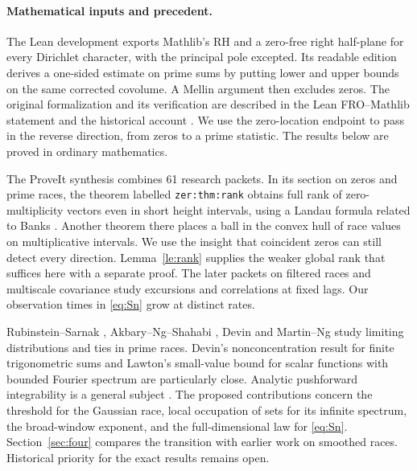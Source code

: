 \documentclass[11pt,letterpaper]{article}
\begin{document}
\paragraph{Mathematical inputs and precedent.}
The Lean development \cite{sernau} exports Mathlib's RH and a zero-free right half-plane for every Dirichlet character, with the principal pole excepted. Its readable edition derives a one-sided estimate on prime sums by putting lower and upper bounds on the same corrected covolume. A Mellin argument then excludes zeros. The original formalization and its verification are described in the Lean FRO--Mathlib statement \cite{lean} and the historical account \cite{wiki}. We use the zero-location endpoint to pass in the reverse direction, from zeros to a prime statistic. The results below are proved in ordinary mathematics.

The ProveIt synthesis \cite{proveit} combines 61 research packets. In its section on zeros and prime races, the theorem labelled \texttt{zer:thm:rank} obtains full rank of zero-multiplicity vectors even in short height intervals, using a Landau formula related to Banks \cite{banks}. Another theorem there places a ball in the convex hull of race values on multiplicative intervals. We use the insight that coincident zeros can still detect every direction. Lemma~\ref{le:rank} supplies the weaker global rank that suffices here with a separate proof. The later packets on filtered races and multiscale covariance study excursions and correlations at fixed lags. Our observation times in \eqref{eq:Sn} grow at distinct rates.

Rubinstein--Sarnak \cite{rs}, Akbary--Ng--Shahabi \cite{ans}, Devin \cite{devin} and Martin--Ng \cite{mn} study limiting distributions and ties in prime races. Devin's nonconcentration result for finite trigonometric sums and Lawton's small-value bound for scalar functions with bounded Fourier spectrum \cite{lawton} are particularly close. Analytic pushforward integrability is a general subject \cite{ghs}. The proposed contributions concern the threshold for the Gaussian race, local occupation of sets for its infinite spectrum, the broad-window exponent, and the full-dimensional law for \eqref{eq:Sn}. Section~\ref{sec:four} compares the transition with earlier work on smoothed races. Historical priority for the exact results remains open.









\end{document}
